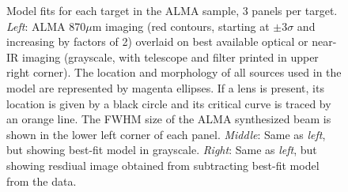 \documentclass[iop]{emulateapj}
\begin{document}
\begin{figure}[!tbp]
\caption{ Model fits for each target in the ALMA sample, 3 panels per target.
{\it Left}: ALMA 870$\mu$m imaging (red contours, starting at $\pm 3\sigma$ and
increasing by factors of 2) overlaid on best available optical or near-IR
imaging (grayscale, with telescope and filter printed in upper right corner).
The location and morphology of all sources used in the model are represented by
magenta ellipses.  If a lens is present, its location is given by a black
circle and its critical curve is traced by an orange line.  The FWHM size of
the ALMA synthesized beam is shown in the lower left corner of each panel.
{\it Middle}: Same as {\it left}, but showing best-fit model in grayscale.
{\it Right}: Same as {\it left}, but showing resdiual image obtained from
subtracting best-fit model from the data.  \label{fig:uvmodels}}
\addtocounter{figure}{-1}

\end{figure}
\end{document}
